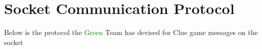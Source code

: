 \part{Socket Communication Protocol}


{\large 
	Below is the protocol the \textcolor{green}{Green} Team 
	has devised for Clue game messages on the socket
}

